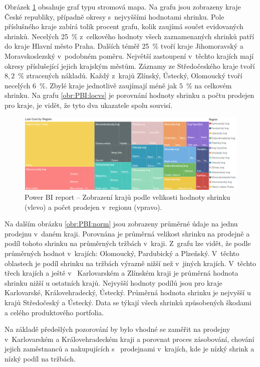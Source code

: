 Obrázek \ref*{obr:PBI:loc} obsahuje graf typu stromová mapa. Na grafu jsou zobrazeny kraje České republiky, případně okresy s~nejvyššími hodnotami shrinku. Pole příslušného kraje zabírá tolik procent grafu, kolik zaujímá součet evidovaných shrinků. Necelých 25~\% z~celkového hodnoty všech zaznamenaných shrinků patří do kraje Hlavní město Praha. Dalších téměř 25~\% tvoří kraje Jihomoravský a Moravskoslezský v~podobném poměru. Největší zastoupení v~těchto krajích mají okresy příslušející jejich krajským městům. Záznamy ze Středočeského kraje tvoří $8{,}2$~\% ztracených nákladů. Každý z~krajů Zlínský, Ústecký, Olomoucký tvoří necelých $6$~\%. Zbylé kraje jednotlivě zaujímají méně jak $5$~\% na celkovém shrinku. Na grafu \ref*{obr:PBI:locvs} je porovnání hodnoty shrinku a počtu prodejen pro kraje, je vidět, že tyto dva ukazatele spolu souvisí.

\begin{figure}[h!]
    \centering
    \captionsetup{justification=centering}
    \includegraphics[width=\textwidth]{obrazky/PBI/location.png}
    \caption{Power BI report -- Zobrazení krajů podle velikosti hodnoty shrinku (vlevo) a počet prodejen v~regionu (vpravo).}
    \label{obr:PBI:loc}
\end{figure}

Na dalším obrázku \ref*{obr:PBI:norm} jsou zobrazeny průměrné údaje na jednu prodejnu v~daném kraji. Porovnána je průměrná velikost shrinku na prodejně a podíl tohoto shrinku na průměrných tržbách v~kraji. Z~grafu lze vidět, že podle průměrných hodnot v~krajích: Olomoucký, Pardubický a Plzeňský. V~těchto oblastech je podíl shrinku na tržbách výrazně nižší než v~jiných krajích. V~těchto třech krajích a ještě v~ Karlovarském a Zlínském kraji je průměrná hodnota shrinku nižší u ostatních krajů. Nejvyšší hodnoty podílů jsou pro kraje Karlovarské, Královehradecký, Ústecký. Průměrná hodnota shrinku je nejvyšší u krajů Středočeský a Ústecký. 
Data se týkají všech shrinků způsobených škodami a celého produktového portfolia.

Na základě předešlých pozorování by bylo vhodné se zaměřit na prodejny v~Karlovarském a Královehradeckém kraji a porovnat proces zásobování, chování jejich zaměstnanců a nakupujících s~ prodejnami v~krajích, kde je nízký shrink a nízký podíl na tržbách.

